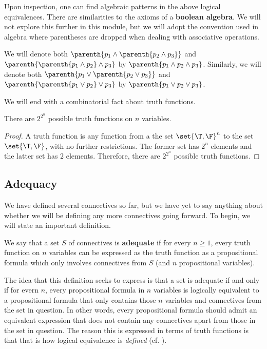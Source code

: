 Upon inspection, one can find algebraic patterns in the above logical equivalences. There are similarities to the axioms of a \textbf{boolean algebra}. %
We will not explore this further in this module, but we will adopt the convention used in algebra where parentheses are dropped when dealing with associative operations.

\begin{boxconvention}
    We will denote both $\parenth{p_1 \land \parenth{p_2 \land p_3}}$ and $\parenth{\parenth{p_1 \land p_2} \land p_3}$ by $\parenth{p_1 \land p_2 \land p_3}$. Similarly, we will denote both $\parenth{p_1 \lor \parenth{p_2 \lor p_3}}$ and $\parenth{\parenth{p_1 \lor p_2} \lor p_3}$ by $\parenth{p_1 \lor p_2 \lor p_3}$.
\end{boxconvention}

We will end with a combinatorial fact about truth functions.

\begin{boxlemma}
    There are $2^{2^n}$ possible truth functions on $n$ variables.
\end{boxlemma}
\begin{proof}
    A truth function is any function from a the set $\set{\T, \F}^n$ to the set $\set{\T, \F}$, with no further restrictions. The former set has $2^n$ elements and the latter set has $2$ elements. Therefore, there are $2^{2^n}$ possible truth functions.
\end{proof}

\subsection{Adequacy}

We have defined several connectives so far, but we have yet to say anything about whether we will be defining any more connectives going forward. To begin, we will state an important definition.

\begin{boxdefinition}[Adequacy]\label{Ch1:Def:Adequacy}
    We say that a set $S$ of connectives is \textbf{adequate} if for every $n \geq 1$, every truth function on $n$ variables can be expressed as the truth function as a propositional formula which only involves connectives from $S$ (and $n$ propositional variables).
\end{boxdefinition}

The idea that this definition seeks to express is that a set is adequate if and only if for evern $n$, every propositional formula in $n$ variables is logically equivalent to a propositional formula that only contains those $n$ variables and connectives from the set in question. In other words, every propositional formula should admit an equivalent expression that does not contain any connectives apart from those in the set in question. The reason this is expressed in terms of truth functions is that that is how logical equivalence is \textit{defined} (cf. ).

